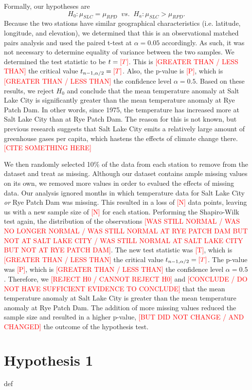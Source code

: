 \documentclass[final]{siamart1116}
\begin{document}
Formally, our hypotheses are $$ H_{0}: \mu_{SLC} = \mu_{RPD} \;\; vs. \;\; H_{a}: \mu_{SLC} > \mu_{RPD}.$$ Because the two stations have similar geographical characteristics (i.e. latitude, longitude, and elevation), we determined that this is an observational matched pairs analysis and used the paired t-test at $\alpha = 0.05$ accordingly. As such, it was not necessary to determine equality of variance between the two samples. We determined the test statistic to be $t = \textcolor{red}{[T]}$. This is \textcolor{red}{[GREATER THAN / LESS THAN]} the critical value $t_{n-1,\alpha/2} = \textcolor{red}{[T]}$. Also, the p-value is \textcolor{red}{[P]}, which is \textcolor{red}{[GREATER THAN / LESS THAN]} the confidence level $\alpha = 0.5$. Based on these results, we reject $H_{0}$ and conclude that the mean temperature anomaly at Salt Lake City is significantly greater than the mean temperature anomaly at Rye Patch Dam. In other words, since 1975, the temperature has increased more at Salt Lake City than at Rye Patch Dam. The reason for this is not known, but previous research suggests that Salt Lake City emits a relatively large amount of greenhouse gases per capita, which hastens the effects of climate change there. \textcolor{red}{[CITE SOMETHING HERE]}

We then randomly selected 10\% of the data from each station to remove from the dataset and treat as missing. Although our dataset contains ample missing values on its own, we removed more values in order to evalued the effects of missing data. Our analysis ignored months in which temperature data for Salt Lake City \textit{or} Rye Patch Dam was missing. This resulted in a loss of \textcolor{red}{[N]} data points, leaving us with a new sample size of \textcolor{red}{[N]} for each station. Performing the Shapiro-Wilk test again, the distribution of the observations \textcolor{red}{[WAS STILL NORMAL / WAS NO LONGER NORMAL / WAS STILL NORMAL AT RYE PATCH DAM BUT NOT AT SALT LAKE CITY / WAS STILL NORMAL AT SALT LAKE CITY BUT NOT AT RYE PATCH DAM]}. The new test statistic was \textcolor{red}{[T]}, which is \textcolor{red}{[GREATER THAN / LESS THAN]} the critical value  $t_{n-1,\alpha/2} = \textcolor{red}{[T]}$. The p-value was \textcolor{red}{[P]}, which is \textcolor{red}{[GREATER THAN / LESS THAN]} the confidence level $\alpha = 0.5$. Therefore, we \textcolor{red}{[REJECT H0 / CANNOT REJECT H0]} and \textcolor{red}{[CONCLUDE / DO NOT HAVE SUFFICIENT EVIDENCE TO CONCLUDE]} that the mean temperature anomaly at Salt Lake City is greater than the mean temperature anomaly at Rye Patch Dam. The addition of more missing values reduced the sample size and resulted in a higher p-value, \textcolor{red}{[BUT DID NOT CHANGE / AND CHANGED]} the outcome of the hypothesis test.

\section{Hypothesis 1}

def

\tiny



\end{document}
